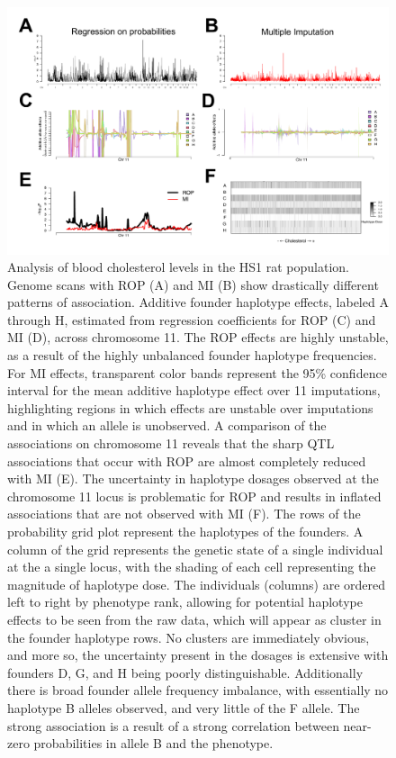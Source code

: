\begin{figure}
\renewcommand{\familydefault}{\sfdefault}\normalfont
\centering
\includegraphics[width=\textwidth]{figures/4-mi/Leah_example.pdf}
\caption[Comparison of ROP and MI in HS rat data]{Analysis of blood cholesterol levels in the HS1 rat population. Genome scans with ROP (A) and MI (B) show drastically different patterns of association. Additive founder haplotype effects, labeled A through H, estimated from regression coefficients for ROP (C) and MI (D), across chromosome 11. The ROP effects are highly unstable, as a result of the highly unbalanced founder haplotype frequencies. For MI effects, transparent color bands represent the 95\% confidence interval for the mean additive haplotype effect over 11 imputations, highlighting regions in which effects are unstable over imputations and in which an allele is unobserved. A comparison of the associations on chromosome 11 reveals that the sharp QTL associations that occur with ROP are almost completely reduced with MI (E). The uncertainty in haplotype dosages observed at the chromosome 11 locus is problematic for ROP and results in inflated associations that are not observed with MI (F). The rows of the probability grid plot represent the haplotypes of the founders. A column of the grid represents the genetic state of a single individual at the a single locus, with the shading of each cell representing the magnitude of haplotype dose. The individuals (columns) are ordered left to right by phenotype rank, allowing for potential haplotype effects to be seen from the raw data, which will appear as cluster in the founder haplotype rows. No clusters are immediately obvious, and more so, the uncertainty present in the dosages is extensive with founders D, G, and H being poorly distinguishable. Additionally there is broad founder allele frequency imbalance, with essentially no haplotype B alleles observed, and very little of the F allele. The strong association is a result of a strong correlation between near-zero probabilities in allele B and the phenotype. \label{fig:Leah_example}}
\end{figure}


